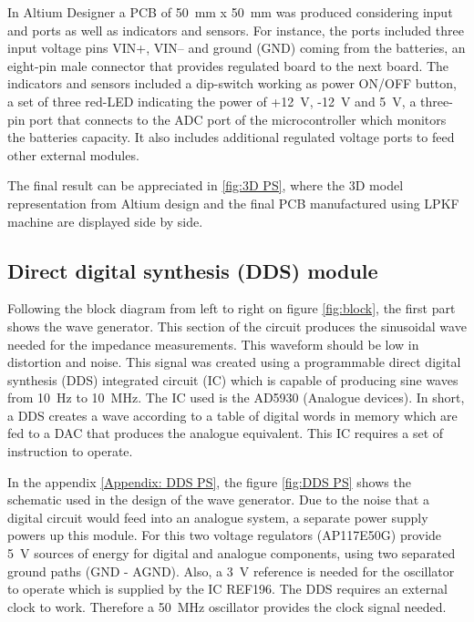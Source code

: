 In Altium Designer a PCB of \SI{50}{\milli\meter} x \SI{50}{\milli\meter} was produced considering input and ports as well as indicators and sensors. For instance, the ports included three input voltage pins VIN+, VIN– and ground (GND) coming from the batteries, an eight-pin male connector that provides regulated board to the next board. The indicators and sensors included a dip-switch working as power ON/OFF button, a set of three red-LED indicating the power of +\SI{12}{\volt}, -\SI{12}{\volt} and \SI{5}{\volt}, a three-pin port that connects to the ADC port of the microcontroller which monitors the batteries capacity. It also includes additional regulated voltage ports to feed other external modules.

The final result can be appreciated in \ref{fig:3D PS}, where the 3D model representation from Altium design and the final PCB manufactured using LPKF machine are displayed side by side. 


\subsection{Direct digital synthesis (DDS) module}
\label{section DDS}
Following the block diagram from left to right on figure \ref{fig:block}, the first part shows the wave generator. This section of the circuit produces the sinusoidal wave needed for the impedance measurements. This waveform should be low in distortion and noise. This signal was created using a programmable direct digital synthesis (DDS) integrated circuit (IC) which is capable of producing sine waves from \SI{10}{\hertz} to \SI{10}{\mega\hertz}. The IC used is the AD5930 (Analogue devices). In short, a DDS creates a wave according to a table of digital words in memory which are fed to a DAC that produces the analogue equivalent. This IC requires a set of instruction to operate. 

In the appendix \ref{Appendix: DDS PS}, the figure \ref{fig:DDS PS} shows the schematic used in the design of the wave generator. Due to the noise that a digital circuit would feed into an analogue system, a separate power supply powers up this module. For this two voltage regulators (AP117E50G) provide \SI{5}{\volt} sources of energy for digital and analogue components, using two separated ground paths (GND - AGND). Also, a \SI{3}{\volt} reference is needed for the oscillator to operate which is supplied by the IC REF196. The DDS requires an external clock to work. Therefore a \SI{50}{\mega\hertz} oscillator provides the clock signal needed.

